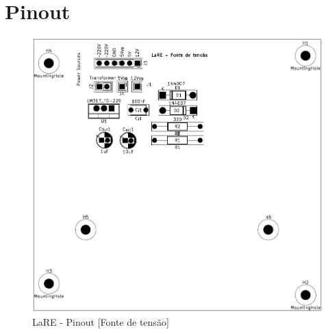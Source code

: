 \documentclass[a4paper,oneside,final,twocolumn]{article}
\begin{document}
\newpage

\raggedright


\newpage

\tableofcontents
\listoftables

\newpage

\section{Pinout}
\begin{figure}[hbtp]
    \centering
    \includegraphics[width=1\textwidth]{fonte_DATASHEET.png}
    \caption{LaRE - Pinout [Fonte de tensão]}
    \label{fig:arquitecturalore}
\end{figure}
\centering
\end{document}
